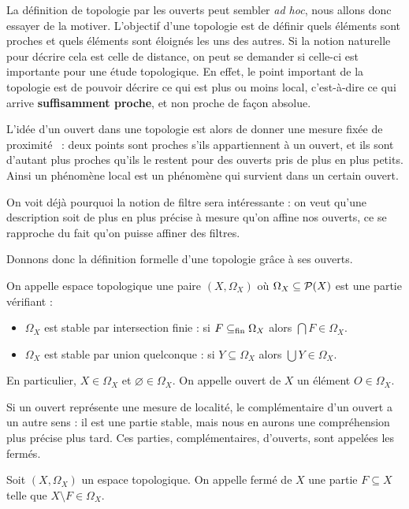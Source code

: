 La définition de topologie par les ouverts peut sembler \textit{ad hoc}, nous
allons donc essayer de la motiver. L'objectif d'une topologie est de définir
quels éléments sont proches et quels éléments sont éloignés les uns des autres.
Si la notion naturelle pour décrire cela est celle de distance, on peut se
demander si celle-ci est importante pour une étude topologique. En effet, le
point important de la topologie est de pouvoir décrire ce qui est plus ou moins
local, c'est-à-dire ce qui arrive \textbf{suffisamment proche}, et non proche de
façon absolue.

L'idée d'un ouvert dans une topologie est alors de donner une mesure fixée de
proximité~ : deux points sont proches s'ils appartiennent à un ouvert, et ils
sont d'autant plus proches qu'ils le restent pour des ouverts pris de plus en
plus petits. Ainsi un phénomène local est un phénomène qui survient dans un
certain ouvert.

On voit déjà pourquoi la notion de filtre sera intéressante : on veut qu'une
description soit de plus en plus précise à mesure qu'on affine nos ouverts,
ce se rapproche du fait qu'on puisse affiner des filtres.

Donnons donc la définition formelle d'une topologie grâce à ses ouverts.

\begin{definition}
  On appelle espace topologique une paire $(X,\Omega_X)$ où
  $\Omega_X\subseteq\mathcal{P}(X)$ est une partie vérifiant :
  \begin{itemize}
  \item $\Omega_X$ est stable par intersection finie : si $F\subseteq_{\mathrm{fin}} \Omega_X$
    alors $\bigcap F \in \Omega_X$.
  \item $\Omega_X$ est stable par union quelconque : si $Y\subseteq \Omega_X$
    alors $\bigcup Y \in \Omega_X$.
  \end{itemize}

  En particulier, $X\in \Omega_X$ et $\varnothing\in \Omega_X$. On appelle
  ouvert de $X$ un élément $O\in\Omega_X$.
\end{definition}

Si un ouvert représente une mesure de localité, le complémentaire d'un ouvert a
un autre sens : il est une partie stable, mais nous en aurons une compréhension
plus précise plus tard. Ces parties, complémentaires, d'ouverts, sont appelées
les fermés.

\begin{definition}[Fermé]
  Soit $(X,\Omega_X)$ un espace topologique. On appelle fermé de $X$ une partie
  $F\subseteq X$ telle que $X\setminus F \in \Omega_X$.
\end{definition}

